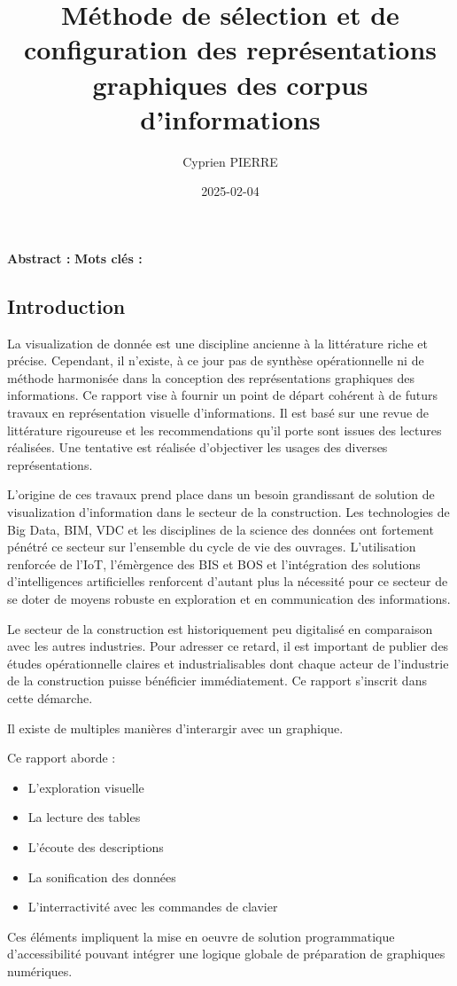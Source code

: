 \documentclass[a4paper,12pt]{article}
\author{Cyprien PIERRE \orcidlink{0009-0009-9040-6795}}
\date{2025-02-04}
\title{Méthode de sélection et de configuration des représentations graphiques des corpus d'informations}
\begin{document}
\maketitle
\renewcommand\{\abstractname\{\textbf{Abstract : }
\renewcommand\{\keywordsname\{\textbf{Mots clés : }

\begin{multicols}{2}
\section*{Introduction}
\label{sec:org636916f}
La visualization de donnée est une discipline ancienne à la littérature riche et précise. Cependant, il n'existe, à ce jour pas de synthèse opérationnelle ni de méthode harmonisée dans la conception des représentations graphiques des informations. Ce rapport vise à fournir un point de départ cohérent à de futurs travaux en représentation visuelle d'informations. Il est basé sur une revue de littérature rigoureuse et les recommendations qu'il porte sont issues des lectures réalisées. Une tentative est réalisée d'objectiver les usages des diverses représentations.

L'origine de ces travaux prend place dans un besoin grandissant de solution de visualization d'information dans le secteur de la construction. Les technologies de Big Data, BIM, VDC et les disciplines de la science des données ont fortement pénétré ce secteur sur l'ensemble du cycle de vie des ouvrages. \autocite{asiauniversitytaichungtaiwanResearchApplicationFunctiontechnologyaesthetics2020} L'utilisation renforcée de l'IoT, l'émèrgence des BIS et BOS et l'intégration des solutions d'intelligences artificielles renforcent d'autant plus la nécessité pour ce secteur de se doter de moyens robuste en exploration et en communication des informations.

Le secteur de la construction est historiquement peu digitalisé en comparaison avec les autres industries. Pour adresser ce retard, il est important de publier des études opérationnelle claires et industrialisables dont chaque acteur de l'industrie de la construction puisse bénéficier immédiatement. Ce rapport s'inscrit dans cette démarche.

Il existe de multiples manières d'interargir avec un graphique. \autocite{schwabish1CenteringAccessibility2022,frankelavsky2RightTools2022}

Ce rapport aborde :
\begin{itemize}
\item L'exploration visuelle
\item La lecture des tables
\item L'écoute des descriptions
\item La sonification des données
\item L'interractivité avec les commandes de clavier
\end{itemize}
Ces éléments impliquent la mise en oeuvre de solution programmatique d'accessibilité pouvant intégrer une logique globale de préparation de graphiques numériques.


\end{multicols}
\end{document}
